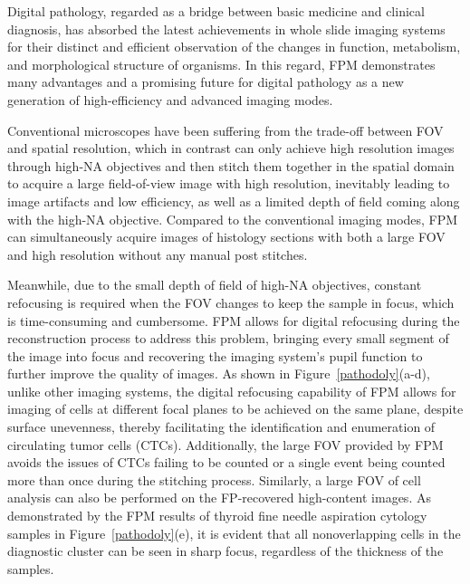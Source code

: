 \documentclass[journal,review,submit,pdftex,moreauthors]{Definitions/mdpi}
\begin{document}
Digital pathology, regarded as a bridge between basic medicine and clinical diagnosis\cite{burger1991pathology}, has absorbed the latest achievements in whole slide imaging systems for their distinct and efficient observation of the changes in function, metabolism, and morphological structure of organisms. In this regard, FPM demonstrates many advantages and a promising future for digital pathology as a new generation of high-efficiency and advanced imaging modes.

Conventional microscopes have been suffering from the trade-off between FOV and spatial resolution, which in contrast can only achieve high resolution images through high-NA objectives and then stitch them together in the spatial domain to acquire a large field-of-view image with high resolution, inevitably leading to image artifacts and low efficiency, as well as a limited depth of field coming along with the high-NA objective\cite{zheng2013wide}. Compared to the conventional imaging modes, FPM can simultaneously acquire images of histology sections with both a large FOV and high resolution without any manual post stitches. 

Meanwhile, due to the small depth of field of high-NA objectives, constant refocusing is required when the FOV changes to keep the sample in focus, which is time-consuming and cumbersome. FPM allows for digital refocusing during the reconstruction process to address this problem, bringing every small segment of the image into focus\cite{claveau2020digital} and recovering the imaging system’s pupil function to further improve the quality of images\cite{ou2014embedded,song2019full}. As shown in Figure~\ref{pathodoly}(a-d), unlike other imaging systems, the digital refocusing capability of FPM allows for imaging of cells at different focal planes to be achieved on the same plane, despite surface unevenness, thereby facilitating the identification and enumeration of circulating tumor cells (CTCs). Additionally, the large FOV provided by FPM avoids the issues of CTCs failing to be counted or a single event being counted more than once during the stitching process\cite{williams2014fourier}. Similarly, a large FOV of cell analysis can also be performed on the FP-recovered high-content images. As demonstrated by the FPM results of thyroid fine needle aspiration cytology samples in Figure~\ref{pathodoly}(e), it is evident that all nonoverlapping cells in the diagnostic cluster can be seen in sharp focus, regardless of the thickness of the samples\cite{liang2022all}.
\end{document}
